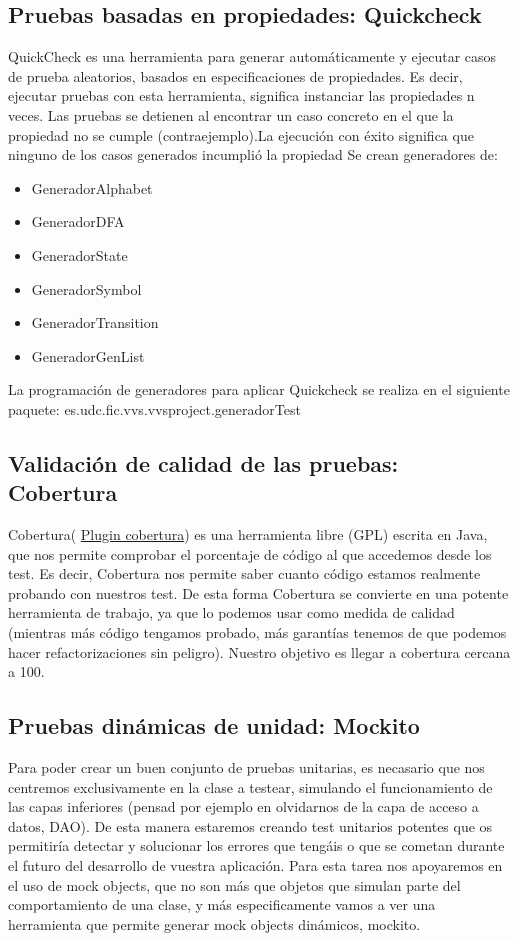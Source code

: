 \documentclass[DIV=calc,paper=a4,fontsize=11pt,onecolumn]{scrartcl} %
\begin{document}
	\subsection{Pruebas basadas en propiedades: Quickcheck}
	QuickCheck es una  herramienta para generar automáticamente y ejecutar casos de prueba aleatorios, basados en especificaciones de propiedades. Es decir, ejecutar pruebas con esta herramienta, significa instanciar las propiedades n veces. Las pruebas se detienen al encontrar un caso concreto en el que la propiedad no se cumple
	(contraejemplo).La ejecución con éxito significa que ninguno de los casos generados incumplió la propiedad
	Se crean generadores de:
	\begin{itemize}
		\item GeneradorAlphabet
		\item GeneradorDFA
		\item GeneradorState
		\item GeneradorSymbol
		\item GeneradorTransition
		\item GeneradorGenList
	\end{itemize}
	
	La programación de generadores para aplicar Quickcheck se realiza en el siguiente paquete: es.udc.fic.vvs.vvsproject.generadorTest
	
	\subsection{Validación de calidad de las pruebas: Cobertura}
	Cobertura( \href{http://cobertura.sourceforge.net/}{Plugin cobertura}) es una herramienta libre (GPL) escrita en Java, que nos permite comprobar el porcentaje de código al que accedemos desde los test. Es decir, Cobertura nos permite saber cuanto código estamos realmente probando con nuestros test.
	De esta forma Cobertura se convierte en una potente herramienta de trabajo, ya que lo podemos usar como medida de calidad (mientras más código tengamos probado, más garantías tenemos de que podemos hacer refactorizaciones sin peligro).
	Nuestro objetivo es llegar a cobertura cercana a 100.
	
	\subsection{Pruebas dinámicas de unidad: Mockito}
	Para poder crear un buen conjunto de pruebas unitarias, es necasario que nos centremos exclusivamente en la clase a testear, simulando el funcionamiento de las capas inferiores (pensad por ejemplo en olvidarnos de la capa de acceso a datos, DAO). De esta manera estaremos creando test unitarios potentes que os permitiría detectar y solucionar los errores que tengáis o que se cometan durante el futuro del desarrollo de vuestra aplicación.
	Para esta tarea nos apoyaremos en el uso de mock objects, que no son más que objetos que simulan parte del comportamiento de una clase, y más especificamente vamos a ver una herramienta que permite generar mock objects dinámicos, mockito.
	
\end{document}
